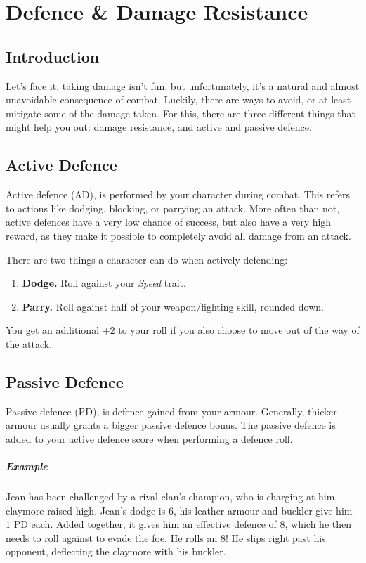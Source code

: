 \chapter{Defence \& Damage Resistance}\label{chap:defence}
\section{Introduction}
Let's face it, taking damage isn't fun, but unfortunately, it's a natural and almost unavoidable consequence of combat.
Luckily, there are ways to avoid, or at least mitigate some of the damage taken.
For this, there are three different things that might help you out: damage resistance, and active and passive defence.

\section{Active Defence}
Active defence (AD), is performed by your character during combat.
This refers to actions like dodging, blocking, or parrying an attack.
More often than not, active defences have a very low chance of success, but also have a very high reward, as they make it possible to completely avoid all damage from an attack.

There are two things a character can do when actively defending:
\begin{enumerate}
    \item \textbf{Dodge.} Roll against your \textit{Speed} trait.
    \item \textbf{Parry.} Roll against half of your weapon/fighting skill, rounded down.
\end{enumerate}
You get an additional $+2$ to your roll if you also choose to move out of the way of the attack.

\section{Passive Defence}
Passive defence (PD), is defence gained from your armour.
Generally, thicker armour usually grants a bigger passive defence bonus.
The passive defence is added to your active defence score when performing a defence roll.

\paragraph{Example} Jean has been challenged by a rival clan's champion, who is charging at him, claymore raised high.
Jean's dodge is 6, his leather armour and buckler give him 1 PD each.
Added together, it gives him an effective defence of 8, which he then needs to roll against to evade the foe.
He rolls an 8! He slips right past his opponent, deflecting the claymore with his buckler.

